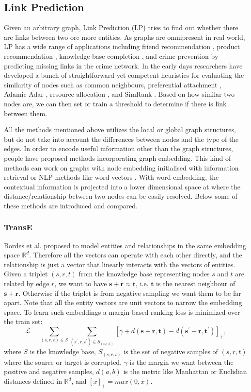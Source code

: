 \documentclass[12pt]{report}
\begin{document}
\subsection {Link Prediction}
Given an arbitrary graph, Link Prediction (LP) tries to find out whether there are links between two ore more entities. As graphs are omnipresent in real world, LP has a wide range of applications including friend recommendation \cite{adamic_friends_2003}, product recommendation \cite{talasu_link_2017}, knowledge base completion \cite{nickel_review_2016}, and crime prevention \cite{berlusconi_link_2016} by predicting missing links in the crime network. In the early days researchers have developed a bunch of straightforward yet competent heuristics for evaluating the similarity of nodes such as common neighbours, preferential attachment \cite{barabasi_emergence_1999}, Adamic-Adar \cite{adamic_friends_2003}, resource allocation \cite{zhou_predicting_2009}, and SimRank \cite{jeh_simrank:_2002}.
Based on how similar two nodes are, we can then set or train a threshold to determine if there is link between them.

All the methods mentioned above utilizes the local or global graph structures, but do not take into account the differences between nodes and the type of the edges. In order to encode useful information other than the graph structures, people have proposed methods incorporating graph embedding. This kind of methods  can work on graphs with node embedding initialised with information retrieval or NLP methods like word vectors \cite{mikolov_distributed_2013}. With word embedding, the contextual information is projected into a lower dimensional space at where the distance/relationship between two nodes can be easily resolved. Below some of these methods are introduced and compared.

\subsubsection{TransE}
Bordes et al. \cite{bordes_translating_2013} proposed to model entities and relationships in the same embedding space $\mathbb{R}^d$. Therefore all the vectors can operate with each other directly, and the relationship is just a vector that linearly interacts with
the vectors of entities.
Given a triplet $(s, r, t)$ from the knowledge base representing nodes $s$ and $t$ are related by edge $r$, we want to have $\mathbf{s}+\mathbf{r}\approx\mathbf{t}$, i.e. $\mathbf{t}$ is the nearest neighbour of $\mathbf{s}+\mathbf{r}$. Otherwise if the triplet is from negative sampling we want them to be far apart. Note that all the entity vectors are unit vectors to narrow the embedding space. To learn such embeddings a margin-based ranking loss is minimized over the train set:
\[\mathcal{L} = \sum_{(s,r,t)\in S}\sum_{(s^\prime,r,t^\prime)\in S_{(s,r,t)}}[\gamma+d(\mathbf{s}+\mathbf{r}, \mathbf{t})-d(\mathbf{s^\prime}+\mathbf{r},\mathbf{t^\prime})]_+,\]
where $S$ is the knowledge base, $S_{(s,r,t)}$ is the set of negative samples of $(s,r,t)$ where the source or target is corrupted, $\gamma$ is the margin we want between the positive and negative samples, $d(a, b)$ is the metric like Manhattan or Euclidian distances defined in $\mathbb{R}^d$, and $[x]_+=max(0,x)$.
\end{document}
